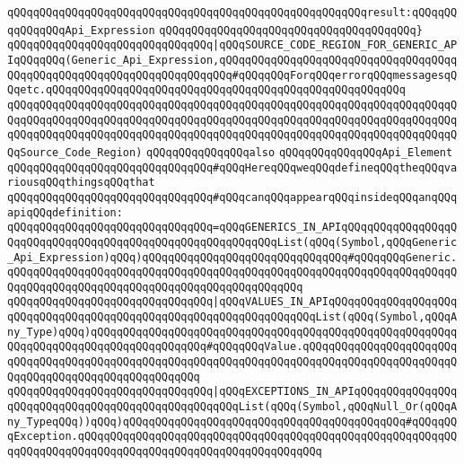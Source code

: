 \verb|qQQqqQQqqQQqqQQqqQQqqQQqqQQqqQQqqQQqqQQqqQQqqQQqqQQqqQQqresult:qQQqqQQqqQQqqQQqApi_Expression|\newline
\verb|qQQqqQQqqQQqqQQqqQQqqQQqqQQqqQQqqQQqqQQq}|\newline
\verb|qQQqqQQqqQQqqQQqqQQqqQQqqQQqqQQq|\verb#|qQQqSOURCE_CODE_REGION_FOR_GENERIC_APIqQQqqQQq(Generic_Api_Expression,qQQqqQQqqQQqqQQqqQQqqQQqqQQqqQQqqQQqqQQqqQQqqQQqqQQqqQQqqQQqqQQqqQQqqQQq#\verb|#qQQqqQQqForqQQqerrorqQQqmessagesqQQqetc.qQQqqQQqqQQqqQQqqQQqqQQqqQQqqQQqqQQqqQQqqQQqqQQqqQQqqQQq|\newline
\verb|qQQqqQQqqQQqqQQqqQQqqQQqqQQqqQQqqQQqqQQqqQQqqQQqqQQqqQQqqQQqqQQqqQQqqQQqqQQqqQQqqQQqqQQqqQQqqQQqqQQqqQQqqQQqqQQqqQQqqQQqqQQqqQQqqQQqqQQqqQQqqQQqqQQqqQQqqQQqqQQqqQQqqQQqqQQqqQQqqQQqqQQqqQQqqQQqqQQqqQQqqQQqqQQqqQQqSource_Code_Region)|\newline
\newline
\newline
\newline
\verb|qQQqqQQqqQQqqQQqalso|\newline
\verb|qQQqqQQqqQQqqQQqApi_Element|\newline
\newline
\verb|qQQqqQQqqQQqqQQqqQQqqQQqqQQqqQQq#qQQqHereqQQqweqQQqdefineqQQqtheqQQqvariousqQQqthingsqQQqthat|\newline
\verb|qQQqqQQqqQQqqQQqqQQqqQQqqQQqqQQq#qQQqcanqQQqappearqQQqinsideqQQqanqQQqapiqQQqdefinition:|\newline
\newline
\verb|qQQqqQQqqQQqqQQqqQQqqQQqqQQqqQQq=qQQqGENERICS_IN_APIqQQqqQQqqQQqqQQqqQQqqQQqqQQqqQQqqQQqqQQqqQQqqQQqqQQqqQQqqQQqList(qQQq(Symbol,qQQqGeneric_Api_Expression)qQQq)qQQqqQQqqQQqqQQqqQQqqQQqqQQqqQQq#qQQqqQQqGeneric.qQQqqQQqqQQqqQQqqQQqqQQqqQQqqQQqqQQqqQQqqQQqqQQqqQQqqQQqqQQqqQQqqQQqqQQqqQQqqQQqqQQqqQQqqQQqqQQqqQQqqQQqqQQqqQQqqQQq|\newline
\verb|qQQqqQQqqQQqqQQqqQQqqQQqqQQqqQQq|\verb#|qQQqVALUES_IN_APIqQQqqQQqqQQqqQQqqQQqqQQqqQQqqQQqqQQqqQQqqQQqqQQqqQQqqQQqqQQqqQQqqQQqList(qQQq(Symbol,qQQqAny_Type)qQQq)qQQqqQQqqQQqqQQqqQQqqQQqqQQqqQQqqQQqqQQqqQQqqQQqqQQqqQQqqQQqqQQqqQQqqQQqqQQqqQQqqQQqqQQq#\verb|#qQQqqQQqValue.qQQqqQQqqQQqqQQqqQQqqQQqqQQqqQQqqQQqqQQqqQQqqQQqqQQqqQQqqQQqqQQqqQQqqQQqqQQqqQQqqQQqqQQqqQQqqQQqqQQqqQQqqQQqqQQqqQQqqQQqqQQq|\newline
\verb|qQQqqQQqqQQqqQQqqQQqqQQqqQQqqQQq|\verb#|qQQqEXCEPTIONS_IN_APIqQQqqQQqqQQqqQQqqQQqqQQqqQQqqQQqqQQqqQQqqQQqqQQqqQQqList(qQQq(Symbol,qQQqNull_Or(qQQqAny_TypeqQQq))qQQq)qQQqqQQqqQQqqQQqqQQqqQQqqQQqqQQqqQQqqQQqqQQq#\verb|#qQQqqQQqException.qQQqqQQqqQQqqQQqqQQqqQQqqQQqqQQqqQQqqQQqqQQqqQQqqQQqqQQqqQQqqQQqqQQqqQQqqQQqqQQqqQQqqQQqqQQqqQQqqQQqqQQqqQQq|\newline
